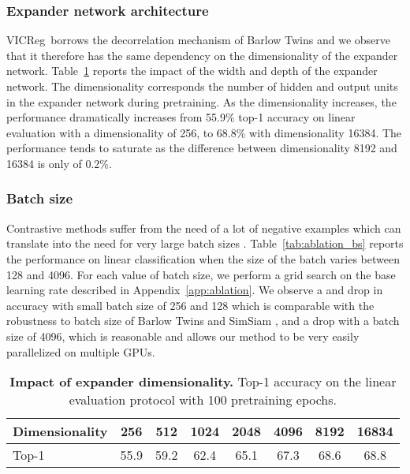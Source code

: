 \documentclass{article}
\newcommand{\algo}{VICReg}
\begin{document}
\clearpage

\subsubsection{Expander network architecture} \label{app:expander_archi}
\algo \ borrows the decorrelation mechanism of Barlow Twins \cite{zbontar2021barlow} and we observe that it therefore has the same dependency on the dimensionality of the expander network. Table~\ref{tab:ablation_expander} reports the impact of the width and depth of the expander network. The dimensionality corresponds the number of hidden and output units in the expander network during pretraining. As the dimensionality increases, the performance dramatically increases from 55.9\% top-1 accuracy on linear evaluation with a dimensionality of 256, to 68.8\% with dimensionality 16384. The performance tends to saturate as the difference between dimensionality 8192 and 16384 is only of 0.2\%.

\subsubsection{Batch size} \label{sec:batch_size} Contrastive methods suffer from the need of a lot of negative examples which can translate into the need for very large batch sizes \cite{chen2020simclr}. Table~\ref{tab:ablation_bs} reports the performance on linear classification when the size of the batch varies between 128 and 4096. For each value of batch size, we perform a grid search on the base learning rate described in Appendix~\ref{app:ablation}. We observe a  and  drop in accuracy with small batch size of 256 and 128 which is comparable with the robustness to batch size of Barlow Twins \cite{zbontar2021barlow} and SimSiam \cite{chen2020simsiam}, and a  drop with a batch size of 4096, which is reasonable and allows our method to be very easily parallelized on multiple GPUs.

\begin{table}[t]
\caption{\textbf{Impact of expander dimensionality.} Top-1 accuracy on the linear evaluation protocol with 100 pretraining epochs.}
\label{tab:ablation_expander}
\vspace{-6mm}
\setlength{\tabcolsep}{10.5pt}
\vskip 0.15in
\begin{center}
\begin{tabular}{lccccccc}
\toprule
Dimensionality      & 256      & 512      & 1024      & 2048     & 4096  &  8192  &  16834 \\
\midrule
Top-1           & 55.9 & 59.2 & 62.4 & 65.1 & 67.3 & 68.6 & 68.8 \\
\bottomrule
\end{tabular}
\end{center}
\vspace{-2mm}
\end{table}
\end{document}
